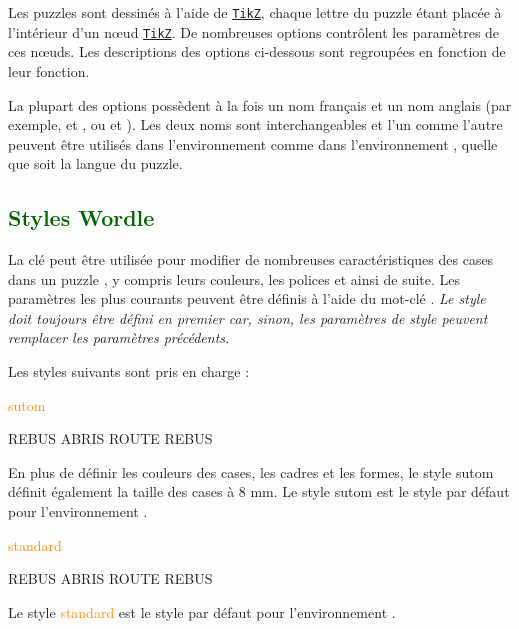 \documentclass[svgnames]{report}
\newcommand\ctan[1]{\href{https://www.ctan.org/pkg/#1}{\texttt{#1}}}
\newcommand\Section[1]{\subsection{\textcolor{DarkGreen}{#1}}}
\begin{document}
  Les puzzles  sont dessinés à l'aide de \ctan{TikZ}, chaque lettre du puzzle étant placée à l'intérieur d'un nœud \ctan{TikZ}. De nombreuses options contrôlent les paramètres de ces nœuds. Les descriptions des options ci-dessous sont regroupées en fonction de leur fonction.

  La plupart des options possèdent à la fois un nom français et un nom anglais (par exemple,  et , ou  et ). Les deux noms sont interchangeables et l'un comme l'autre peuvent être utilisés dans l'environnement  comme dans l'environnement , quelle que soit la langue du puzzle.

  \Section{Styles Wordle}

  La clé  peut être utilisée pour modifier de nombreuses caractéristiques des cases dans un puzzle , y compris leurs couleurs, les polices et ainsi de suite. Les paramètres les plus courants peuvent être définis à l'aide du mot-clé . \textit{Le style doit toujours être défini en premier car, sinon, les paramètres de style peuvent remplacer les paramètres précédents.}

  Les styles suivants sont pris en charge :

  \textcolor{DarkOrange}{sutom}

  \begin{example}
  \begin{GrilleSutom}[Style=sutom]{REBUS}
    ABRIS
    ROUTE
    REBUS
  \end{GrilleSutom}
  \end{example}

  En plus de définir les couleurs des cases, les cadres et les formes, le style \textsf{sutom} définit également la taille des cases à 8 mm. Le style \textsf{sutom} est le style par défaut pour l'environnement .

  \textcolor{DarkOrange}{standard}

  \begin{example}
  \begin{GrilleSutom}[Style=standard]{REBUS}
    ABRIS
    ROUTE
    REBUS
  \end{GrilleSutom}
  \end{example}

  Le style \textcolor{DarkOrange}{standard} est le style par défaut pour l'environnement .
\end{document}
